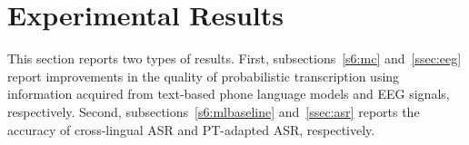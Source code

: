 \section{Experimental Results}
\label{sec:results}

This section reports two types of results.  First,
subsections~\ref{s6:mc} and~\ref{ssec:eeg} report improvements in the
quality of probabilistic transcription using information acquired from
text-based phone language models and EEG signals, respectively.
Second, subsections~\ref{s6:mlbaseline} and~\ref{ssec:asr} reports the
accuracy of cross-lingual ASR and PT-adapted ASR, respectively.

